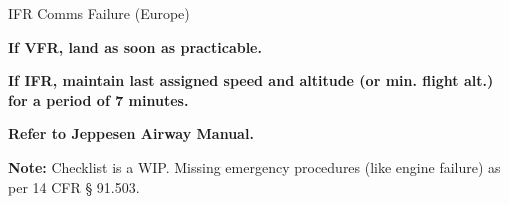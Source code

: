 \begin{checklist_emerg}{IFR Comms Failure (Europe)}

    \begin{center}
        \textbf{If VFR, land as soon as practicable.}
    \end{center}

    \begin{center}
        \textbf{If IFR, maintain last assigned speed and altitude (or min. flight alt.) for a period of 7 minutes.}
    \end{center}

    \begin{center}
        \textbf{Refer to Jeppesen Airway Manual.}
    \end{center}
\end{checklist_emerg}

\textbf{Note:} Checklist is a WIP. Missing emergency procedures (like engine failure) as per 14 CFR § 91.503.

\onecolumn
